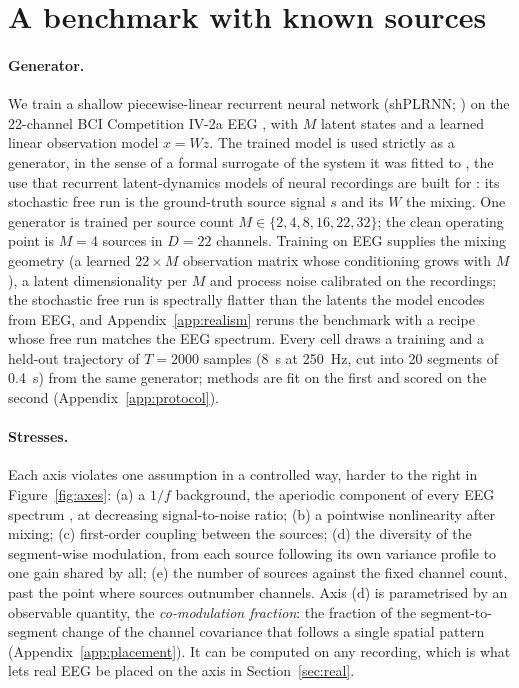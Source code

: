 \section{A benchmark with known sources}
\label{sec:benchmark}

\paragraph{Generator.}
We train a shallow piecewise-linear recurrent neural network (shPLRNN; \citealp{brenner2024shPLRNN,hess2023gtf}) on the 22-channel BCI Competition IV-2a EEG \citep{brunner2008bci,tangermann2012review}, with $M$ latent states and a learned linear observation model $x = Wz$.
The trained model is used strictly as a generator, in the sense of a formal surrogate of the system it was fitted to \citep{durstewitz2023reconstructing}, the use that recurrent latent-dynamics models of neural recordings are built for \citep{pandarinath2018lfads,koppe2019identifying,ramezanian2022generative}: its stochastic free run is the ground-truth source signal $s$ and its $W$ the mixing.
One generator is trained per source count $M \in \{2, 4, 8, 16, 22, 32\}$; the clean operating point is $M = 4$ sources in $D = 22$ channels.
Training on EEG supplies the mixing geometry (a learned $22 \times M$ observation matrix whose conditioning grows with $M$), a latent dimensionality per $M$ and process noise calibrated on the recordings; the stochastic free run is spectrally flatter than the latents the model encodes from EEG, and Appendix~\ref{app:realism} reruns the benchmark with a recipe whose free run matches the EEG spectrum.
Every cell draws a training and a held-out trajectory of $T = 2000$ samples (8~s at 250~Hz, cut into 20 segments of 0.4~s) from the same generator; methods are fit on the first and scored on the second (Appendix~\ref{app:protocol}).

\paragraph{Stresses.}
Each axis violates one assumption in a controlled way, harder to the right in Figure~\ref{fig:axes}: (a) a $1/f$ background, the aperiodic component of every EEG spectrum \citep{donoghue2020parameterizing}, at decreasing signal-to-noise ratio; (b) a pointwise nonlinearity after mixing; (c) first-order coupling between the sources; (d) the diversity of the segment-wise modulation, from each source following its own variance profile to one gain shared by all; (e) the number of sources against the fixed channel count, past the point where sources outnumber channels.
Axis (d) is parametrised by an observable quantity, the \textit{co-modulation fraction}: the fraction of the segment-to-segment change of the channel covariance that follows a single spatial pattern (Appendix~\ref{app:placement}).
It can be computed on any recording, which is what lets real EEG be placed on the axis in Section~\ref{sec:real}.

